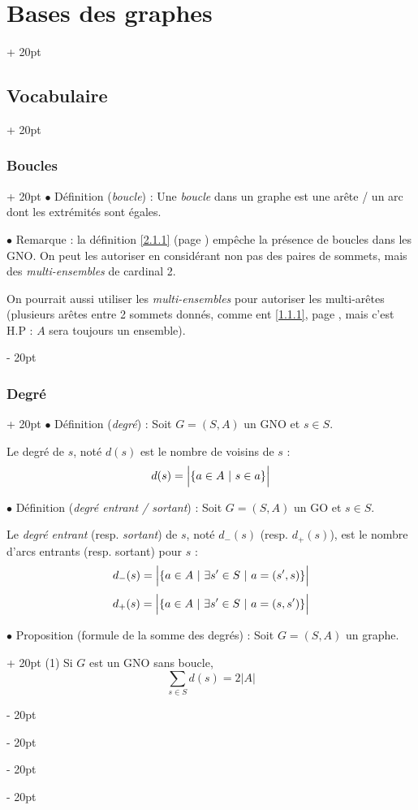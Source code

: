 \documentclass[a4paper, 12pt, twoside]{article}
\newcommand{\set}[1]{\left\{ #1 \right\}}
\newcommand{\abs}[1]{\left\lvert #1 \right\rvert}
\newcommand{\ind}[1][20pt]{\advance\leftskip + #1}
\newcommand{\deind}[1][20pt]{\advance\leftskip - #1}
\newenvironment{indt}[2][20pt]{#2 \par \ind[#1]}{\par \deind} %
\begin{document}
\begin{indt}{\section{Bases des graphes}}
\begin{indt}{\subsection{Vocabulaire}}
            \begin{indt}{\subsubsection{Boucles}}
                $\bullet$ Définition (\textit{boucle}) : Une \textit{boucle} dans un graphe est une arête / un arc dont les extrémités sont égales.

                $\bullet$ Remarque : la définition \ref{2.1.1} (page \pageref{2.1.1}) empêche la présence de boucles dans les GNO.
                On peut les autoriser en considérant non pas des paires de sommets, mais des \textit{multi-ensembles} de cardinal 2.

                On pourrait aussi utiliser les \textit{multi-ensembles} pour autoriser les multi-arêtes (plusieurs arêtes entre 2 sommets donnés, comme ent \ref{1.1.1}, page \pageref{1.1.1}, mais c'est H.P : $A$ sera toujours un ensemble).
            \end{indt}

            \vspace{12pt}
            
            \begin{indt}{\subsubsection{Degré}}
                $\bullet$ Définition (\textit{degré}) : Soit $G = (S, A)$ un GNO et $s \in S$.

                Le degré de $s$, noté $d(s)$  est le nombre de voisins de $s$ :
                \[
                    d(s) = \abs{\vphantom{\dfrac a a}\!\set{a \in A\ |\ s \in a}}
                \]
                
                $\bullet$ Définition (\textit{degré entrant / sortant}) : Soit $G = (S, A)$ un GO et $s \in S$.

                Le \textit{degré entrant} (resp. \textit{sortant}) de $s$, noté $d_-(s)$  (resp. $d_+(s)$), est le nombre d'arcs entrants (resp. sortant) pour $s$ :
                \[
                    d_-(s) = \abs{\vphantom{\dfrac a a}\!\set{a \in A\ |\ \exists s' \in S\ |\ a = (s', s)}}
                \]
                \[
                    d_+(s) = \abs{\vphantom{\dfrac a a}\!\set{a \in A\ |\ \exists s' \in S\ |\ a = (s, s')}}
                \]
                
                \begin{indt}{$\bullet$ Proposition (formule de la somme des degrés) : Soit $G = (S, A)$ un graphe.}
                    (1) Si $G$ est un GNO sans boucle,
                    \[
                        \sum_{s \in S} d(s) = 2\abs{A}
                    \]


\end{indt}
\end{indt}
\end{indt}
\end{indt}
\end{document}
